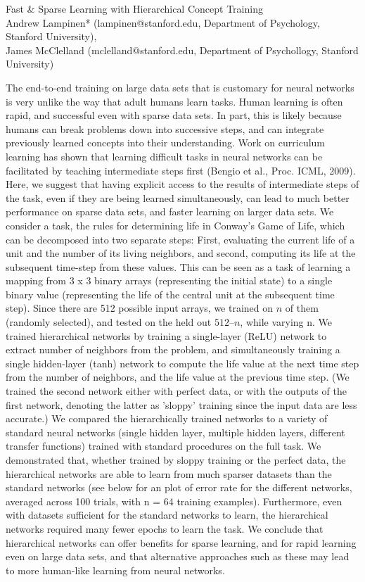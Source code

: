 \documentclass[10pt]{article}
\begin{document}
\begingroup  
  \centering
  \large Fast \& Sparse Learning with Hierarchical Concept Training\\[1.5em]
  \small{Andrew Lampinen* (lampinen@stanford.edu, Department of Psychology, Stanford University),\\ James McClelland (mclelland@stanford.edu, Department of Psychollogy, Stanford University)}\par
\endgroup
\vspace{10pt}
\noindent
The end-to-end training on large data sets that is customary for neural networks is very unlike the way that adult humans learn tasks. Human learning is often rapid, and successful even with sparse data sets. In part, this is likely because humans can break problems down into successive steps, and can integrate previously learned concepts into their understanding. Work on curriculum learning has shown that learning difficult tasks in neural networks can be facilitated by teaching intermediate steps first (Bengio et al., Proc. ICML, 2009). Here, we suggest that having explicit access to the results of intermediate steps of the task, even if they are being learned simultaneously, can lead to much better performance on sparse data sets, and faster learning on larger data sets. We consider a task, the rules for determining life in Conway's Game of Life, which can be decomposed into two separate steps: First, evaluating the current life of a unit and the number of its living neighbors, and second, computing its life at the subsequent time-step from these values. This can be seen as a task of learning a mapping from 3 x 3 binary arrays (representing the initial state) to a single binary value (representing the life of the central unit at the subsequent time step). Since there are 512 possible input arrays, we trained on $n$ of them (randomly selected), and tested on the held out $512 – n$, while varying n. We trained hierarchical networks by training a single-layer (ReLU) network to extract number of neighbors from the problem, and simultaneously training a single hidden-layer (tanh) network to compute the life value at the next time step from the number of neighbors, and the life value at the previous time step. (We trained the second network either with perfect data, or with the outputs of the first network, denoting the latter as 'sloppy' training since the input data are less accurate.) We compared the hierarchically trained networks to a variety of standard neural networks (single hidden layer, multiple hidden layers, different transfer functions) trained with standard procedures on the full task. We demonstrated that, whether trained by sloppy training or the perfect data, the hierarchical networks are able to learn from much sparser datasets than the standard networks (see below for an plot of error rate for the different networks, averaged across 100 trials, with n = 64 training examples). Furthermore, even with datasets sufficient for the standard networks to learn, the hierarchical networks required many fewer epochs to learn the task. We conclude that hierarchical networks can offer benefits for sparse learning, and for rapid learning even on large data sets, and that alternative approaches such as these may lead to more human-like learning from neural networks.
\end{document}
